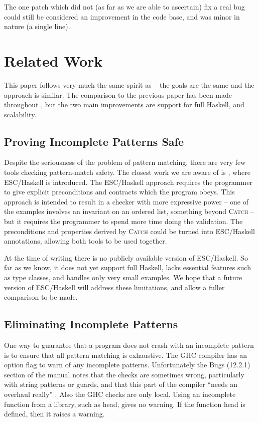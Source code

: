 \documentclass[preprint]{sigplanconf}
\let\cite=\citep
\newcommand{\C}[1]{\textsf{#1}}
\newcommand{\catch}{\textsc{Catch}}
\begin{document}
The one patch which did not (as far as we are able to ascertain) fix a real bug could still be considered an improvement in the code base, and was minor in nature (a single line).


\section{Related Work}
\label{sec:related}

This paper follows very much the same spirit as \cite{me:catch_tfp} -- the goals are the same and the approach is similar. The comparison to the previous paper has been made throughout , but the two main improvements are support for full Haskell, and scalability.

\subsection{Proving Incomplete Patterns Safe}

Despite the seriousness of the problem of pattern matching, there are very few tools checking pattern-match safety. The closest work we are aware of is \citep{esc_haskell}, where ESC/Haskell is introduced. The ESC/Haskell approach requires the programmer to give explicit preconditions and contracts which the program obeys. This approach is intended to result in a checker with more expressive power -- one of the examples involves an invariant on an ordered list, something beyond \catch{} -- but it requires the programmer to spend more time doing the validation. The preconditions and properties derived by \catch{} could be turned into ESC/Haskell annotations, allowing both tools to be used together.

At the time of writing there is no publicly available version of ESC/Haskell. So far as we know, it does not yet support full Haskell, lacks essential features such as type classes, and handles only very small examples. We hope that a future version of ESC/Haskell will address these limitations, and allow a fuller comparison to be made.


\subsection{Eliminating Incomplete Patterns}

One way to guarantee that a program does not crash with an incomplete pattern is to ensure that all pattern matching is exhaustive. The GHC compiler \citep{ghc} has an option flag to warn of any incomplete patterns. Unfortunately the Bugs (12.2.1) section of the manual notes that the checks are sometimes wrong, particularly with string patterns or guards, and that this part of the compiler ``needs an overhaul really'' \citep{ghc_manual}. Also the GHC checks are only local. Using an incomplete function from a library, such as \C{head}, gives no warning. If the function \C{head} is defined, then it raises a warning.
\end{document}

